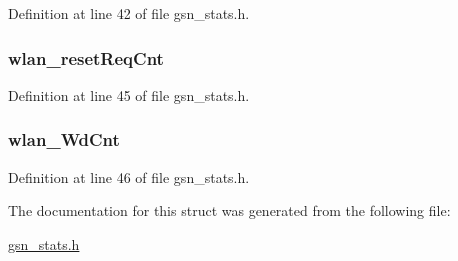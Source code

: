 Definition at line 42 of file gsn\_\-stats.h.

\hypertarget{a00260_a54d7c806a50fbf511fa3268ea308d70e}{
\subsubsection[{wlan\_\-resetReqCnt}]{ {\bf wlan\_\-resetReqCnt}}}
\label{a00260_a54d7c806a50fbf511fa3268ea308d70e}


Definition at line 45 of file gsn\_\-stats.h.

\hypertarget{a00260_acb73acc03334be77902872ab54921303}{
\subsubsection[{wlan\_\-WdCnt}]{ {\bf wlan\_\-WdCnt}}}
\label{a00260_acb73acc03334be77902872ab54921303}


Definition at line 46 of file gsn\_\-stats.h.



The documentation for this struct was generated from the following file:\begin{DoxyCompactItemize}
\item 
\hyperlink{a00591}{gsn\_\-stats.h}\end{DoxyCompactItemize}
